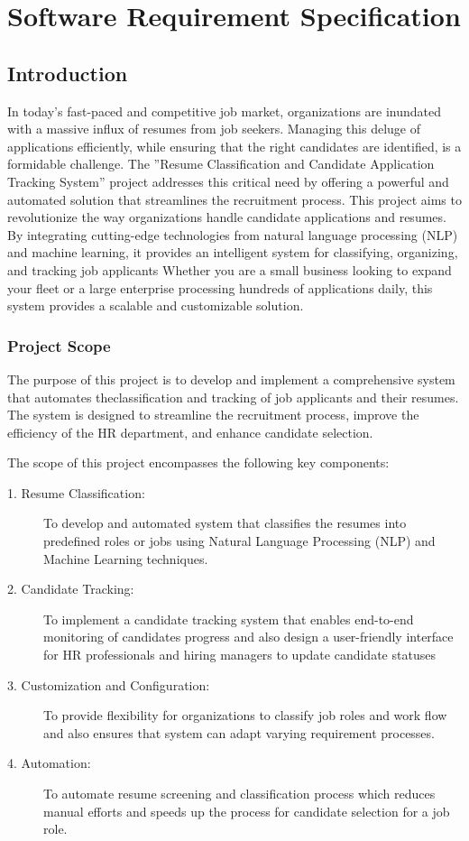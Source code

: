 \chapter{Software Requirement Specification}

\section{Introduction}
In today's fast-paced and competitive job market, organizations are inundated with a massive influx of resumes from job seekers. Managing this deluge of applications efficiently, while ensuring that the right candidates are identified, is a formidable challenge. The ”Resume Classification and Candidate Application Tracking System” project addresses this critical need by offering a powerful and automated solution that streamlines the recruitment process. This project aims to revolutionize the way organizations handle candidate applications and resumes. By integrating cutting-edge technologies from natural language processing (NLP) and machine learning, it provides an intelligent system for classifying, organizing, and tracking job applicants Whether you are a small business looking to expand your fleet or a large enterprise processing hundreds of applications daily, this system provides a  scalable and customizable solution.

\subsection{Project Scope}
The purpose of this project is to develop and implement a comprehensive system that automates theclassification and tracking of job applicants and their resumes. The system is designed to streamline the recruitment process, improve the efficiency of the HR department, and enhance candidate selection. 

The scope of this project encompasses the following key components:
\begin{description}
    \item [1. Resume Classification:] To develop and automated system that classifies the resumes into predefined roles or jobs using Natural Language Processing (NLP) and Machine Learning techniques. 
    \item [2. Candidate Tracking:] To implement a candidate tracking system that enables end-to-end monitoring of candidates progress and also design a user-friendly interface for HR professionals and hiring managers to update candidate statuses
    \item [3. Customization and Configuration:] To provide flexibility for organizations to classify job roles and work flow and also ensures that system can adapt varying requirement processes.
    \item [4. Automation:] To automate resume screening and classification process which reduces manual efforts and speeds up the process for candidate selection for a job role.
\end{description}


